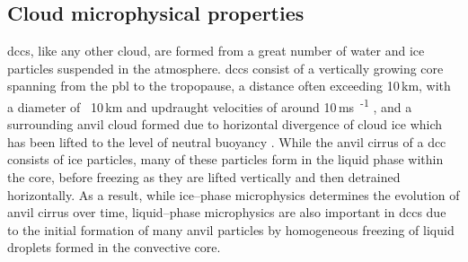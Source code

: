
\subsection{Cloud microphysical properties}

\acrshort{dcc}s, like any other cloud, are formed from a great number of water and ice particles suspended in the atmosphere.
\acrshort{dcc}s consist of a vertically growing core spanning from the \acrfull{pbl} to the tropopause, a distance often exceeding 10\,\unit{km}, with a diameter of ~10\,\unit{km} and updraught velocities of around 10\,\unit{ms\textsuperscript{-1}} \citep{weisman_mesoscale_2015}, and a surrounding anvil cloud formed due to horizontal divergence of cloud ice which has been lifted to the level of neutral buoyancy \citep{houze_chapter_2014}.
While the anvil cirrus of a \acrshort{dcc} consists of ice particles, many of these particles form in the liquid phase within the core, before freezing as they are lifted vertically and then detrained horizontally.
As a result, while ice--phase microphysics determines the evolution of anvil cirrus over time, liquid--phase microphysics are also important in \acrshort{dcc}s due to the initial formation of many anvil particles by homogeneous freezing of liquid droplets formed in the convective core.

